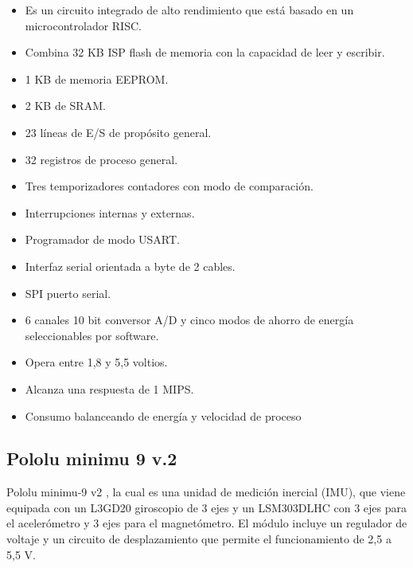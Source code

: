			\begin{itemize}	
				
				\item Es un circuito integrado de alto rendimiento que est\'a basado en un microcontrolador RISC.
				
				\item Combina 32 KB ISP flash de memoria con la capacidad de leer y escribir.
				
				\item 1 KB de memoria EEPROM.
				
				\item 2 KB de SRAM.
				
				\item 23 l\'ineas de E/S de prop\'osito general.
				
				\item 32 registros de proceso general.
				
				\item  Tres temporizadores contadores con modo de comparaci\'on.
				
				\item Interrupciones internas y externas.
				
				\item Programador de modo USART.
				
				\item Interfaz serial orientada a byte de 2 cables.
				
				\item SPI puerto serial.
				
				\item 6 canales 10 bit conversor A/D y cinco modos de ahorro de energ\'ia seleccionables por software.
				
				\item Opera entre 1,8 y 5,5 voltios.
				
				\item Alcanza una respuesta de 1 MIPS.
				
				\item Consumo balanceando de energ\'ia y velocidad de proceso
				
			\end{itemize}
		
		\subsection{Pololu minimu 9 v.2}
		
			Pololu minimu-9 v2 \cite{Pololu}, la cual es una unidad de medici\'on inercial (IMU), que viene equipada con un L3GD20 giroscopio de 3 ejes y un LSM303DLHC con 3 ejes para el aceler\'ometro y 3 ejes para el magnet\'ometro. El m\'odulo incluye un regulador de voltaje y un circuito de desplazamiento que permite el funcionamiento de 2,5 a 5,5 V.
			

